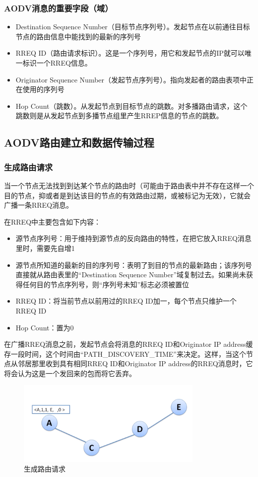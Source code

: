 \documentclass[12pt,a4paper]{article}
\begin{document}
\subsubsection{AODV消息的重要字段（域）}
\begin{itemize}
\item Destination Sequence Number（目标节点序列号）。发起节点在以前通往目标节点的路由信息中能找到的最新的序列号
\item RREQ ID（路由请求标识）。这是一个序列号，用它和发起节点的IP就可以唯一标识一个RREQ信息。
\item Originator Sequence Number（发起节点序列号）。指向发起者的路由表项中正在使用的序列号
\item Hop Count（跳数）。从发起节点到目标节点的跳数。对多播路由请求，这个跳数则是从发起节点到多播节点组里产生RREP信息的节点的跳数。
\end{itemize}

\subsection{AODV路由建立和数据传输过程}
\subsubsection{生成路由请求}
当一个节点无法找到到达某个节点的路由时（可能由于路由表中并不存在这样一个目的节点，抑或者是到达该目的节点的有效路由过期，或被标记为无效），它就会广播一条RREQ消息。

在RREQ中主要包含如下内容：

\begin{itemize}
\item 源节点序列号：用于维持到源节点的反向路由的特性，在把它放入RREQ消息里时，需要先自增1
\item 源节点所知道的最新的目的序列号：表明了到目的节点的最新路由；该序列号直接就从路由表里的“Destination Sequence Number”域复制过去。如果尚未获得任何目的节点序列号，则“序列号未知”标志必须被置位
\item RREQ ID：将当前节点以前用过的RREQ ID加一，每个节点只维护一个RREQ ID
\item Hop Count：置为0
\end{itemize}

在广播RREQ消息之前，发起节点会将消息的RREQ ID和Originator IP address缓存一段时间，这个时间由“PATH\_DISCOVERY\_TIME”来决定。这样，当这个节点从邻居那里收到具有相同RREQ ID和Originator IP address的RREQ消息时，它将会认为这是一个发回来的包而将它丢弃。

\begin{figure}[htb]
\centering
\includegraphics[width=9cm]{gen_route_request}
\caption{生成路由请求}
\end{figure}
\end{document}

